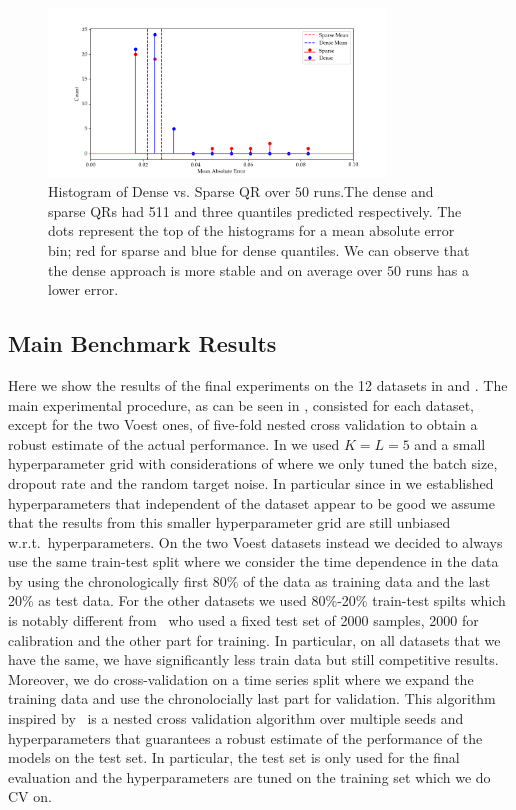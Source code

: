 \begin{figure}
    \centering
    \includegraphics[width=0.8\textwidth]{resources/mean_absolute_error.png}
    \caption[Histogram of Dense vs. Sparse Quantile Restriction]{Histogram of Dense vs. Sparse QR over $50$ runs.\@ The dense and sparse QRs had 511 and three quantiles predicted respectively. The dots represent the top of the histograms for a mean absolute error bin; red for sparse and blue for dense quantiles. We can observe that the dense approach is more stable and on average over $50$ runs has a lower error.}\label{fig:toy_dense_sparse}
\end{figure}

\subsection{Main Benchmark Results}
Here we show the results of the final experiments on the 12 datasets in  and . The main experimental procedure, as can be seen in , consisted for each dataset, except for the two Voest ones, of five-fold nested cross validation to obtain a robust estimate of the actual performance. In  we used $K=L=5$ and a small hyperparameter grid with considerations of  where we only tuned the batch size, dropout rate and the random target noise. In particular since in  we established hyperparameters that independent of the dataset appear to be good we assume that the results from this smaller hyperparameter grid are still unbiased w.r.t.\ hyperparameters. On the two Voest datasets instead we decided to always use the same train-test split where we consider the time dependence in the data by using the chronologically first 80\% of the data as training data and the last 20\% as test data. For the other datasets we used 80\%-20\% train-test spilts which is notably different from~\cite{sesia2021conformal} who used a fixed test set of 2000 samples, 2000 for calibration and the other part for training. In particular, on all datasets that we have the same, we have significantly less train data but still competitive results.  Moreover, we do cross-validation on a time series split where we expand the training data and use the chronolocially last part for validation. This algorithm inspired by~\cite{rothfuss2019noise} is a nested cross validation algorithm over multiple seeds and hyperparameters that guarantees a robust estimate of the performance of the models on the test set. In particular, the test set is only used for the final evaluation and the hyperparameters are tuned on the training set which we do CV on.

